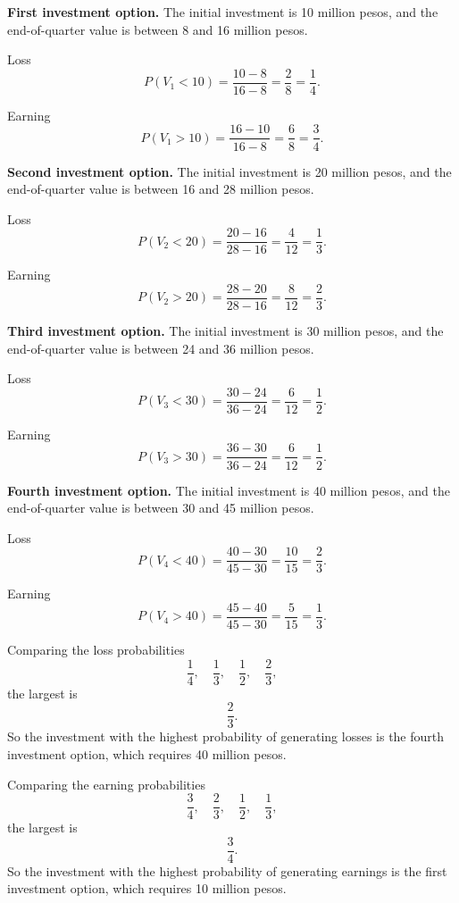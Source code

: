 \medskip

\textbf{First investment option.}
The initial investment is 10 million pesos, and the end-of-quarter value is between 8 and 16 million pesos.

Loss
\[
P(V_1<10)=\frac{10-8}{16-8}=\frac{2}{8}=\frac14.
\]

Earning
\[
P(V_1>10)=\frac{16-10}{16-8}=\frac{6}{8}=\frac34.
\]

\medskip

\textbf{Second investment option.}
The initial investment is 20 million pesos, and the end-of-quarter value is between 16 and 28 million pesos.

Loss
\[
P(V_2<20)=\frac{20-16}{28-16}=\frac{4}{12}=\frac13.
\]

Earning
\[
P(V_2>20)=\frac{28-20}{28-16}=\frac{8}{12}=\frac23.
\]

\medskip

\textbf{Third investment option.}
The initial investment is 30 million pesos, and the end-of-quarter value is between 24 and 36 million pesos.

Loss
\[
P(V_3<30)=\frac{30-24}{36-24}=\frac{6}{12}=\frac12.
\]

Earning
\[
P(V_3>30)=\frac{36-30}{36-24}=\frac{6}{12}=\frac12.
\]

\medskip

\textbf{Fourth investment option.}
The initial investment is 40 million pesos, and the end-of-quarter value is between 30 and 45 million pesos.

Loss
\[
P(V_4<40)=\frac{40-30}{45-30}=\frac{10}{15}=\frac23.
\]

Earning
\[
P(V_4>40)=\frac{45-40}{45-30}=\frac{5}{15}=\frac13.
\]

Comparing the loss probabilities
\[
\frac14,\quad \frac13,\quad \frac12,\quad \frac23,
\]
the largest is
\[
\frac23.
\]
So the investment with the highest probability of generating losses is the fourth investment option, which requires 40 million pesos.

Comparing the earning probabilities
\[
\frac34,\quad \frac23,\quad \frac12,\quad \frac13,
\]
the largest is
\[
\frac34.
\]
So the investment with the highest probability of generating earnings is the first investment option, which requires 10 million pesos.

